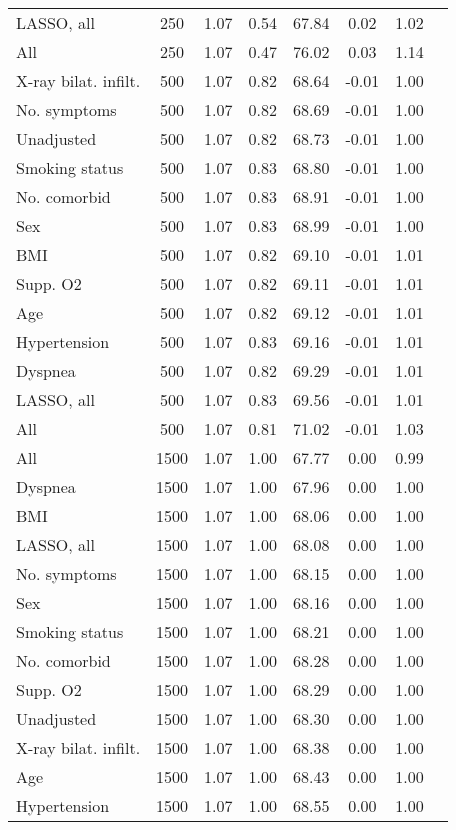 \documentclass{article}
\begin{document}
{\begin{longtable}{lccccccc}
LASSO, all & 250 & 1.07 & 0.54 & 67.84 &  0.02 & 1.02 \\ 
All & 250 & 1.07 & 0.47 & 76.02 &  0.03 & 1.14 \\ \midrule 
X-ray bilat. infilt. & 500 & 1.07 & 0.82 & 68.64 & -0.01 & 1.00 \\ 
No. symptoms & 500 & 1.07 & 0.82 & 68.69 & -0.01 & 1.00 \\ 
Unadjusted & 500 & 1.07 & 0.82 & 68.73 & -0.01 & 1.00 \\ 
Smoking status & 500 & 1.07 & 0.83 & 68.80 & -0.01 & 1.00 \\ 
No. comorbid & 500 & 1.07 & 0.83 & 68.91 & -0.01 & 1.00 \\ 
Sex & 500 & 1.07 & 0.83 & 68.99 & -0.01 & 1.00 \\ 
BMI & 500 & 1.07 & 0.82 & 69.10 & -0.01 & 1.01 \\ 
Supp. O2 & 500 & 1.07 & 0.82 & 69.11 & -0.01 & 1.01 \\ 
Age & 500 & 1.07 & 0.82 & 69.12 & -0.01 & 1.01 \\ 
Hypertension & 500 & 1.07 & 0.83 & 69.16 & -0.01 & 1.01 \\ 
Dyspnea & 500 & 1.07 & 0.82 & 69.29 & -0.01 & 1.01 \\ 
LASSO, all & 500 & 1.07 & 0.83 & 69.56 & -0.01 & 1.01 \\ 
All & 500 & 1.07 & 0.81 & 71.02 & -0.01 & 1.03 \\ \midrule 
All & 1500 & 1.07 & 1.00 & 67.77 &  0.00 & 0.99 \\ 
Dyspnea & 1500 & 1.07 & 1.00 & 67.96 &  0.00 & 1.00 \\ 
BMI & 1500 & 1.07 & 1.00 & 68.06 &  0.00 & 1.00 \\ 
LASSO, all & 1500 & 1.07 & 1.00 & 68.08 &  0.00 & 1.00 \\ 
No. symptoms & 1500 & 1.07 & 1.00 & 68.15 &  0.00 & 1.00 \\ 
Sex & 1500 & 1.07 & 1.00 & 68.16 &  0.00 & 1.00 \\ 
Smoking status & 1500 & 1.07 & 1.00 & 68.21 &  0.00 & 1.00 \\ 
No. comorbid & 1500 & 1.07 & 1.00 & 68.28 &  0.00 & 1.00 \\ 
Supp. O2 & 1500 & 1.07 & 1.00 & 68.29 &  0.00 & 1.00 \\ 
Unadjusted & 1500 & 1.07 & 1.00 & 68.30 &  0.00 & 1.00 \\ 
X-ray bilat. infilt. & 1500 & 1.07 & 1.00 & 68.38 &  0.00 & 1.00 \\ 
Age & 1500 & 1.07 & 1.00 & 68.43 &  0.00 & 1.00 \\ 
Hypertension & 1500 & 1.07 & 1.00 & 68.55 &  0.00 & 1.00 \\
\bottomrule
\hline
\end{longtable}
}
\end{document}

